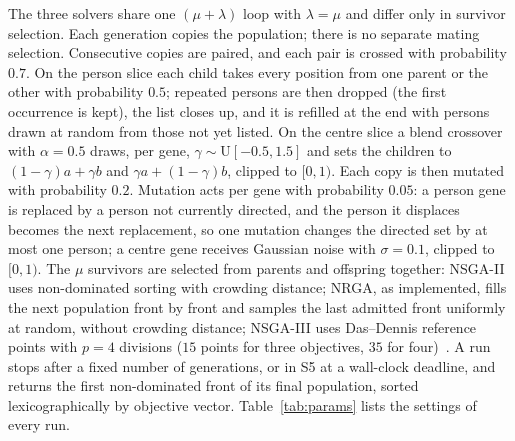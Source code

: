\documentclass[systems,article,accept,moreauthors,pdftex]{Definitions/mdpi}
\begin{document}
The three solvers share one $(\mu+\lambda)$ loop with $\lambda=\mu$ and differ only in
survivor selection. Each generation copies the population; there is no separate mating
selection. Consecutive copies are paired, and each pair is crossed with probability $0.7$.
On the person slice each child takes every position from one parent or the other with
probability $0.5$; repeated persons are then dropped (the first occurrence is kept), the list
closes up, and it is refilled at the end with persons drawn at random from those not yet
listed. On the centre slice a blend crossover with $\alpha=0.5$ draws, per gene,
$\gamma\sim\mathrm{U}[-0.5,1.5]$ and sets the children to $(1-\gamma)a+\gamma b$ and
$\gamma a+(1-\gamma)b$, clipped to $[0,1)$. Each copy is then mutated with probability $0.2$.
Mutation acts per gene with probability $0.05$: a person gene is replaced by a person not
currently directed, and the person it displaces becomes the next replacement, so one
mutation changes the directed set by at most one person; a centre gene receives Gaussian
noise with $\sigma=0.1$, clipped to $[0,1)$. The $\mu$ survivors are selected from parents
and offspring together: NSGA-II uses non-dominated sorting with crowding distance; NRGA, as implemented,
fills the next population front by front and samples the last admitted front uniformly at
random, without crowding distance; NSGA-III uses Das--Dennis reference points with $p=4$
divisions ($15$ points for three objectives, $35$ for four)~\cite{deb2014nsga3}. A run stops
after a fixed number of generations, or in S5 at a wall-clock deadline, and returns the first non-dominated front of its final population, sorted
lexicographically by objective vector. Table~\ref{tab:params} lists the settings of every run.
\end{document}
